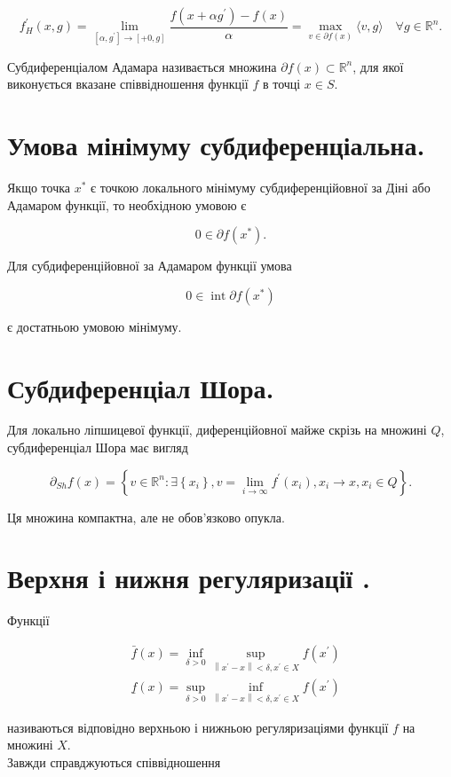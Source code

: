 \documentclass[10pt]{article}
\begin{document}
$$
f_{H}^{\prime}(x, g)=\lim _{\left[\alpha, g^{\prime}\right] \rightarrow[+0, g]} \frac{f\left(x+\alpha g^{\prime}\right)-f(x)}{\alpha}=\max _{v \in \partial f(x)}\langle v, g\rangle \quad \forall g \in \mathbb{R}^{n} .
$$

Субдиференціалом Адамара називається множина $\partial f(x) \subset \mathbb{R}^{n}$, для якої виконується вказане співвідношення функції $f$ в точці $x \in S$.

\section*{Умова мінімуму субдиференціальна.}
Якщо точка $x^{*}$ є точкою локального мінімуму субдиференційовної за Діні або Адамаром функції, то необхідною умовою є

$$
0 \in \partial f\left(x^{*}\right) .
$$

Для субдиференційовної за Адамаром функції умова

$$
0 \in \operatorname{int} \partial f\left(x^{*}\right)
$$

є достатньою умовою мінімуму.

\section*{Субдиференціал Шора.}
Для локально ліпшицевої функції, диференційовної майже скрізь на множині $Q$, субдиференціал Шора має вигляд

$$
\partial_{S h} f(x)=\left\{v \in \mathbb{R}^{n}: \exists\left\{x_{i}\right\}, v=\lim _{i \rightarrow \infty} f^{\prime}\left(x_{i}\right), x_{i} \rightarrow x, x_{i} \in Q\right\} .
$$

Ця множина компактна, але не обов'язково опукла.

\section*{Верхня і нижня регуляризації .}
Функції

$$
\begin{aligned}
& \bar{f}(x)=\inf _{\delta>0} \sup _{\left\|x^{\prime}-x\right\|<\delta, x^{\prime} \in X} f\left(x^{\prime}\right) \\
& \underline{f}(x)=\sup _{\delta>0} \inf _{\left\|x^{\prime}-x\right\|<\delta, x^{\prime} \in X} f\left(x^{\prime}\right)
\end{aligned}
$$

називаються відповідно верхньою і нижньою регуляризаціями функції $f$ на множині $X$.\\
Завжди справджуються співвідношення
\end{document}
